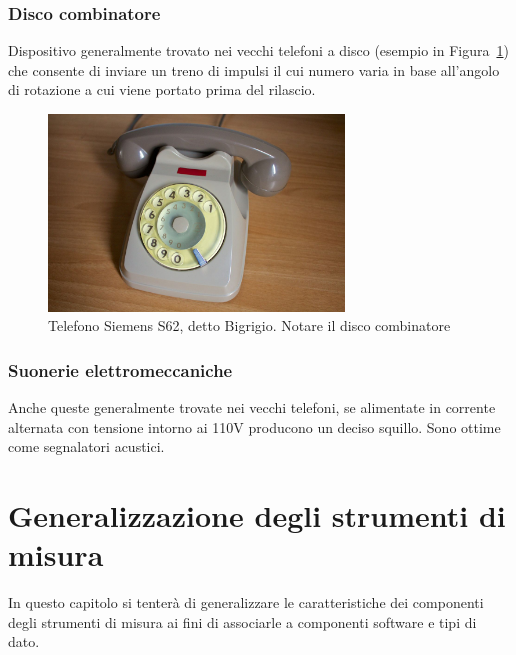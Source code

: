 \documentclass[12pt,a4paper]{report}
\begin{document}
\subsection{Disco combinatore}
Dispositivo generalmente trovato nei vecchi telefoni a disco (esempio in Figura~\ref{fig:siemenss62}) che consente di inviare un
treno di impulsi il cui numero varia in base all'angolo di rotazione a cui viene portato prima del rilascio.

\begin{figure}[h]
  \centering
  \includegraphics[width=0.7\textwidth]{siemenss62}
  \caption{Telefono Siemens S62, detto Bigrigio. Notare il disco combinatore \cite{wiki:siemenss62}}
  \label{fig:siemenss62}
\end{figure}

\subsection{Suonerie elettromeccaniche}
Anche queste generalmente trovate nei vecchi telefoni, se alimentate in corrente alternata con tensione intorno ai 110V
producono un deciso squillo. Sono ottime come segnalatori acustici.

\chapter{Generalizzazione degli strumenti di misura}
In questo capitolo si tenterà di generalizzare le caratteristiche dei componenti degli strumenti di misura ai fini di associarle a componenti
software e tipi di dato.
\end{document}
